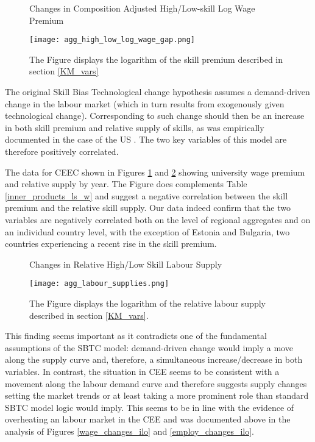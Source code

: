 \documentclass[11pt]{article}
\begin{document}
\begin{figure}[!htbp]%
    \centering
    \caption{Changes in Composition Adjusted High/Low-skill Log Wage Premium}
    {\texttt{[image: agg\_high\_low\_log\_wage\_gap.png]} }
    \label{agg_high_low_log_wage_gap}
    \caption*{\footnotesize The Figure displays the logarithm of the skill premium described in section \ref{KM_vars}}
\end{figure}

The original Skill Bias Technological change hypothesis assumes a demand-driven change in the labour market (which in turn results from exogenously given technological change). Corresponding to such change should then be an increase in both skill premium and relative supply of skills, as was empirically documented in the case of the US \citep{acemoglu2011skills}. The two key variables of this model are therefore positively correlated. 

The data for CEEC shown in Figures \ref{agg_high_low_log_wage_gap} and \ref{agg_labour_supplies} showing university wage premium and relative supply by year. The Figure does complements Table \ref{inner_products_ls_w} and suggest a negative correlation between the skill premium and the relative skill supply. Our data indeed confirm that the two variables are negatively correlated both on the level of regional aggregates and on an individual country level, with the exception of Estonia and Bulgaria, two countries experiencing a recent rise in the skill premium. %


\begin{figure}[!htbp]%
    \centering
    \caption{Changes in Relative High/Low Skill Labour Supply}
    {\texttt{[image: agg\_labour\_supplies.png]} }
    \label{agg_labour_supplies}
    \caption*{\footnotesize The Figure displays the logarithm of the relative labour supply described in section \ref{KM_vars}.}
\end{figure}

This finding seems important as it contradicts one of the fundamental assumptions of the SBTC model: demand-driven change would imply a move along the supply curve and, therefore, a simultaneous increase/decrease in both variables. In contrast, the situation in CEE seems to be consistent with a movement along the labour demand curve and therefore suggests supply changes setting the market trends or at least taking a more prominent role than standard SBTC model logic would imply. This seems to be in line with the evidence of overheating an labour market in the CEE and was documented above in the analysis of Figures \ref{wage_changes_ilo} and \ref{employ_changes_ilo}.
\end{document}
